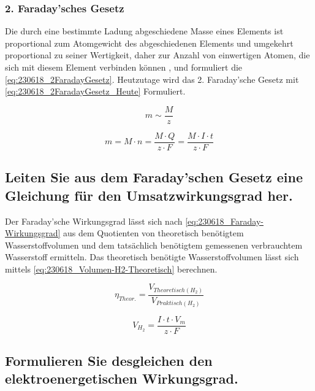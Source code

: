 \subsubsection{2. Faraday'sches Gesetz}

Die durch eine bestimmte Ladung abgeschiedene Masse eines Elements ist proportional zum Atomgewicht des abgeschiedenen Elements und umgekehrt proportional zu seiner Wertigkeit, daher zur Anzahl von einwertigen Atomen, die sich mit diesem Element verbinden können \cite{Faraday_G}, und formuliert die \autoref{eq:230618_2FaradayGesetz}.
Heutzutage wird das 2. Faraday'sche Gesetz mit \autoref{eq:230618_2FaradayGesetz_Heute} Formuliert.

\begin{equation}
    m \sim \frac{M}{z}
    \label{eq:230618_2FaradayGesetz}
\end{equation}

\begin{equation}
    m = M \cdot n = \frac{M \cdot Q}{z \cdot F} = \frac{M \cdot I \cdot t}{z \cdot F}
    \label{eq:230618_2FaradayGesetz_Heute}
\end{equation}

\subsection{Leiten Sie aus dem Faraday'schen Gesetz eine Gleichung für den Umsatzwirkungsgrad her.}

Der Faraday'sche Wirkungsgrad lässt sich nach \autoref{eq:230618_Faraday-Wirkungsgrad} aus dem Quotienten von theoretisch benötigtem Wasserstoffvolumen und dem tatsächlich benötigtem gemessenen verbrauchtem Wasserstoff ermitteln.
Das theoretisch benötigte Wasserstoffvolumen lässt sich mittels \autoref{eq:230618_Volumen-H2-Theoretisch} berechnen.

\begin{equation}
    \eta_{Theor.} = \frac{V_{Theoretisch(H_2)}}{V_{Praktisch(H_2)}}
    \label{eq:230618_Faraday-Wirkungsgrad}
\end{equation}

\begin{equation}
    V_{H_2} = \frac{I \cdot t \cdot V_m}{z \cdot F}
    \label{eq:230618_Volumen-H2-Theoretisch}
\end{equation}

\subsection{Formulieren Sie desgleichen den elektroenergetischen Wirkungsgrad.}

